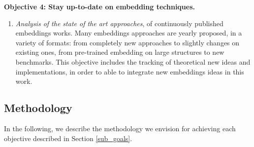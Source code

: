 \noindent\textbf{Objective 4: Stay up-to-date on embedding techniques.}
\begin{enumerate}
    \item \textit{Analysis of the state of the art approaches}, of continuously published embeddings works. Many embeddings approaches are yearly proposed, in a variety of formats: from completely new approaches to slightly changes on existing ones, from pre-trained embedding on large structures to new benchmarks. This objective includes the tracking of theoretical new ideas and implementations, in order to able to integrate new embeddings ideas in this work.
\end{enumerate}





\subsection{Methodology}\label{sub_methodology}
In the following, we describe the methodology we envision for achieving each objective described in Section \ref{sub_goals}.

